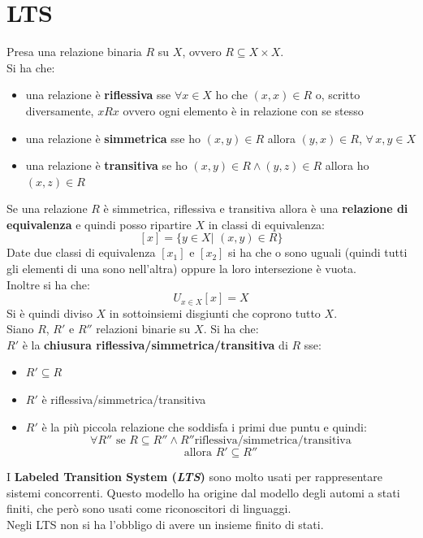 \documentclass[a4paper,12pt, oneside]{book}
\begin{document}
\section{LTS}
\begin{shaded}
  Presa una relazione binaria $R$ su $X$, ovvero $R\subseteq X\times X$.\\
  Si ha che:
  \begin{itemize}
    \item una relazione è \textbf{riflessiva} sse $\forall x\in X$ ho che
    $(x,x)\in R$ o, scritto diversamente, $xRx$ ovvero ogni elemento è in
    relazione con se stesso 
    \item una relazione è \textbf{simmetrica} sse ho $(x,y)\in R$ allora
    $(y,x)\in R$, $\forall\,x,y\in X$
    \item una relazione è \textbf{transitiva} se ho $(x,y)\in R\land (y,z)\in R$
    allora ho $(x,z)\in R$
  \end{itemize}
  Se una relazione $R$ è simmetrica, riflessiva e transitiva allora è una
  \textbf{relazione di equivalenza} e quindi posso ripartire $X$ in classi di
  equivalenza:
  \[[x]=\{y\in X|\,\,(x,y)\in R\}\]
  Date due classi di equivalenza $[x_1]$ e $[x_2]$ si ha che o sono uguali
  (quindi tutti gli elementi di una sono nell'altra) oppure la loro intersezione
  è vuota.\\
  Inoltre si ha che:
  \[U_{x\in X}[x]=X\]
  Si è quindi diviso $X$ in sottoinsiemi disgiunti che coprono tutto $X$.\\
  Siano $R$, $R'$ e $R''$ relazioni binarie su $X$. Si ha che:\\
  $R'$ è la \textbf{chiusura riflessiva/simmetrica/transitiva} di
  $R$ sse: 
  \begin{itemize}
    \item $R'\subseteq R$
    \item $R'$ è riflessiva/simmetrica/transitiva
    \item $R'$ è la più piccola relazione che soddisfa i primi due puntu e
    quindi:
    \[\forall R''\mbox{ se }R\subseteq R''\land
      R''\mbox{riflessiva/simmetrica/transitiva}\]
    \[\mbox{allora } R'\subseteq R''\]
  \end{itemize}
\end{shaded}
I \textbf{Labeled Transition System (\textit{LTS})} sono molto usati per
rappresentare sistemi concorrenti. Questo modello ha origine dal modello degli
automi a stati finiti, che però sono usati come riconoscitori di linguaggi.\\
Negli LTS non si ha l'obbligo di avere un insieme finito di stati.
\end{document}
